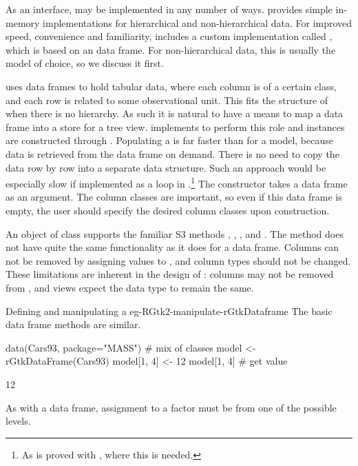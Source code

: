 As an interface,  may be implemented in any number
of ways. \GTK\/ provides simple in-memory implementations for
hierarchical and non-hierarchical data. For improved speed,
convenience and familiarity,  includes a custom
 implementation called , which
is based on an \R\/ data frame. For non-hierarchical data, this is
usually the model of choice, so we discuss it first.

\R\/ uses data frames to hold tabular data, where each column is of a
certain class, and each row is related to some observational
unit. This fits the structure of  when there is no
hierarchy. As such it is natural to have a means to map a data frame
into a store for a tree view.  implements
 to perform this role and instances are
constructed through . Populating a
 is far faster than for a \GTK\/ model, because
data is retrieved from the data frame on demand. There is no need to
copy the data row by row into a separate data structure. Such an
approach would be especially slow if implemented as a loop in
\R.\footnote{As is proved with , where this is needed.} The constructor takes a
data frame as an argument. The column classes are important, so even
if this data frame is empty, the user should specify the desired
column classes upon construction.

An object of class  supports the familiar S3
methods \method{[}{RGtkDataFrame}, \method{[\ASSIGN}{RGtkDataFrame},
, and
. The \code{[$<$-} method does
not have quite the same functionality as it does for a data
frame. Columns can not be removed by assigning values to ,
and column types should not be changed. These limitations are inherent
in the design of \GTK: columns may not be removed from
, and views expect the data type to remain the
same.

\begin{example}{Defining and manipulating a }{eg-RGtk2-manipulate-rGtkDataframe}
  The basic data frame methods are similar.
\begin{Schunk}
\begin{Sinput}
 data(Cars93, package="MASS")             # mix of classes
 model <- rGtkDataFrame(Cars93)
 model[1, 4] <- 12
 model[1, 4]                              # get value
\end{Sinput}
\begin{Soutput}
[1] 12
\end{Soutput}
\end{Schunk}
%
As with a data frame, assignment to a factor must be from one of the
possible levels.

\end{example}

